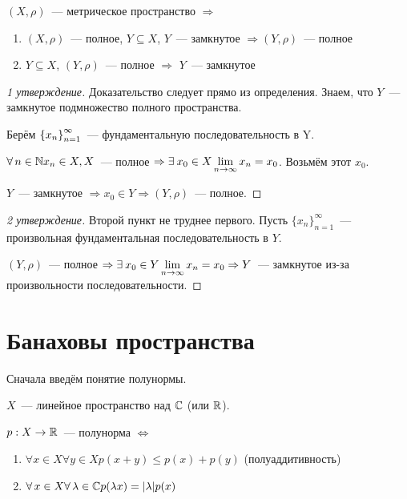 \documentclass[document]{subfiles}
\begin{document}
\begin{theorem}
\label{theo:closed-subset-complete-space}
    $(X,\rho)$~--- метрическое пространство $\Rightarrow$
    \begin{enumerate}
        \item $(X, \rho)$~--- полное, $Y \subseteq X$, $Y$~--- замкнутое $\Rightarrow (Y, \rho)$~--- полное
        \item $Y \subseteq X$, $(Y,\rho)$~--- полное $\Rightarrow$ $Y$~--- замкнутое
    \end{enumerate}
\end{theorem}

\begin{proof}[1 утверждение]
        Доказательство следует прямо из определения. Знаем, что $Y$~--- замкнутое подмножество полного пространства.

        Берём $\left\{x_n\right\}^\infty_{n=1}$~--- фундаментальную последовательность в Y.

        $\forall n \in \bN x_n \in X, X$~--- полное $\Rightarrow \exists x_0 \in X \liml_{n \to \infty} x_n = x_0$. Возьмём этот $x_0$.

        $Y$~--- замкнутое $\Rightarrow x_0 \in Y \Rightarrow (Y, \rho)$~--- полное.
\end{proof}
\begin{proof}[2 утверждение]
        Второй пункт не труднее первого. Пусть $\{x_n\}^\infty_{n=1}$~--- произвольная фундаментальная последовательность в $Y$.

        $(Y, \rho)$~--- полное $\Rightarrow \exists x_0 \in Y \liml_{n \to \infty} x_n = x_0 \Rightarrow Y$~--- замкнутое из-за произвольности последовательности.
\end{proof}

\section{Банаховы пространства}

Сначала введём понятие полунормы.
\begin{definition}[полунорма]
    $X$~--- линейное пространство над $\mathbb{C}$ (или $\mathbb{R}$).

    $p: X \rightarrow \mathbb{R}$~--- полунорма $\Leftrightarrow$
    \begin{enumerate}
        \item $\forall x \in X \forall y \in X p(x + y) \leq p(x) + p(y)$ (полуаддитивность)
        \item $\forall x \in X \forall \lambda \in \bC p(\lambda x) = |\lambda| p(x)$
    \end{enumerate} 
\end{definition}
\end{document}
